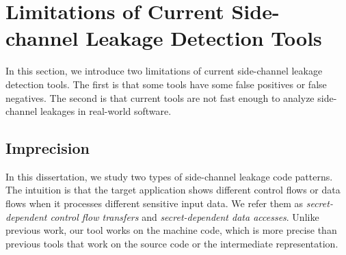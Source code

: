 \section{Limitations of Current Side-channel Leakage Detection Tools}
In this section, we introduce two limitations of current side-channel leakage detection tools. The first is that some tools have some false positives or false negatives. The second is that current tools are not fast enough to analyze side-channel leakages in real-world software.


\subsection{Imprecision}
In this dissertation, we study two types of side-channel leakage code patterns. The intuition is that the target application shows different control flows or data flows when it processes different sensitive input data. We refer them as \textit{secret-dependent control flow transfers} and \textit{secret-dependent data accesses}. Unlike previous work, our tool works on the machine code, which is more precise than previous tools that work on the source code or the intermediate representation.

